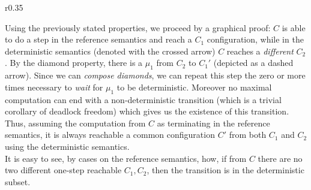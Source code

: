 \documentclass[12pt,a4paper,twoside]{book}
\begin{document}
\begin{wrapfigure}{r}{0.35\textwidth}
  \centering
{}
\end{wrapfigure}

\noindent Using the previously stated properties, we proceed by a graphical proof: $C$ is able to do a step in the reference semantics and reach a $C_1$ configuration, while in the deterministic semantics (denoted with the crossed arrow) $C$ reaches a \emph{different} $C_2$.
By the diamond property, there is a $\mu_1$ from $C_2$ to $C_1'$ (depicted as a dashed arrow). Since we can \emph{compose diamonds}, we can repeat this step the zero or more times necessary to \emph{wait} for $\mu_1$ to be deterministic.
Moreover no maximal computation can end with a non-deterministic transition (which is a trivial corollary of deadlock freedom) which gives us the existence of this transition.
Thus, assuming the computation from $C$ as terminating in the reference semantics, it is always reachable a common configuration $C'$ from both $C_1$ and $C_2$ using the deterministic semantics.\\
It is easy to see, by cases on the reference semantics, how, if from $C$ there are no two different one-step reachable $C_1, C_2$, then the transition is in the deterministic subset.
\end{document}
